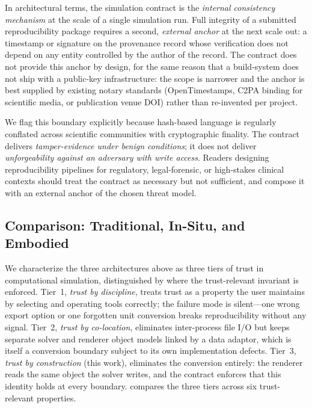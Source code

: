 \documentclass[journal]{IEEEtran}
\begin{document}
In architectural terms, the simulation contract is the \emph{internal
consistency mechanism} at the scale of a single simulation run. Full
integrity of a submitted reproducibility package requires a second,
\emph{external anchor} at the next scale out: a timestamp or signature
on the provenance record whose verification does not depend on any
entity controlled by the author of the record. The contract does not
provide this anchor by design, for the same reason that a build-system
does not ship with a public-key infrastructure: the scope is narrower
and the anchor is best supplied by existing notary standards
(OpenTimestamps, C2PA binding for scientific media, or publication
venue DOI) rather than re-invented per project.

We flag this boundary explicitly because hash-based language is
regularly conflated across scientific communities with cryptographic
finality. The contract delivers \emph{tamper-evidence under benign
conditions}; it does not deliver \emph{unforgeability against an
adversary with write access}. Readers designing reproducibility
pipelines for regulatory, legal-forensic, or high-stakes clinical
contexts should treat the contract as necessary but not sufficient,
and compose it with an external anchor of the chosen threat model.


\subsection{Comparison: Traditional, In-Situ, and Embodied}
\label{sec:model:comparison}

We characterize the three architectures above as three tiers of trust
in computational simulation, distinguished by where the trust-relevant
invariant is enforced. Tier~1, \emph{trust by discipline}, treats
trust as a property the user maintains by selecting and operating tools
correctly; the failure mode is silent---one wrong export option or one
forgotten unit conversion breaks reproducibility without any signal.
Tier~2, \emph{trust by co-location}, eliminates inter-process file I/O
but keeps separate solver and renderer object models linked by a data
adaptor, which is itself a conversion boundary subject to its own
implementation defects. Tier~3, \emph{trust by construction} (this
work), eliminates the conversion entirely: the renderer reads the same
object the solver writes, and the contract enforces that this identity
holds at every boundary.  compares the three tiers
across six trust-relevant properties.
\end{document}
